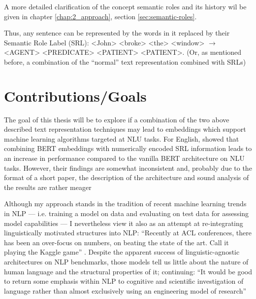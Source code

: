 A more detailed clarification of the concept semantic roles and its history wil be
given in chapter \ref{chap:2_approach}, section \ref{sec:semantic-roles}.

Thus, any sentence can be represented by the words in it replaced by their Semantic Role Label
(SRL): <John> <broke> <the> <window> $\rightarrow$ <AGENT> <PREDICATE> <PATIENT> <PATIENT>.
(Or, as mentioned before, a combination of the ``normal'' text representation combined with SRLs)




\section{Contributions/Goals}

The goal of this thesis will be to explore if a combination of the two above described text
representation techniques may lead to embeddings which support machine learning algorithms
targeted at NLU tasks. For English, \cite{zhang2019semantics} showed that combining BERT
embeddings with numerically encoded SRL information leads to an increase in performance
compared to the vanilla BERT architecture on NLU tasks. However, their findings are somewhat
inconsistent and, probably due to the format of a short paper, the description of the
architecture and sound analysis of the results are {\color{red} rather meager}

Although my approach stands in the tradition of recent machine learning trends in NLP --- i.e.
training a model on data and evaluating on test data for assessing model capabilities --- I
nevertheless view it also as an attempt at re-integrating linguistically motivated structures
into NLP: ``Recently at ACL conferences, there has been an over-focus on numbers, on beating the
state of the art. Call it playing the Kaggle game'' \citep[p.~702]{manning2015computational}.
Despite the apparent success of linguistic-agnostic architectures on NLP benchmarks, those
models tell us little about the nature of human language and the structural properties of it;
\citeauthor{manning2015computational} continuing: ``It would be good to return some emphasis
within NLP to cognitive and scientific investigation of language rather than almost exclusively
using an engineering model of research'' \citep[p.~706]{manning2015computational}

